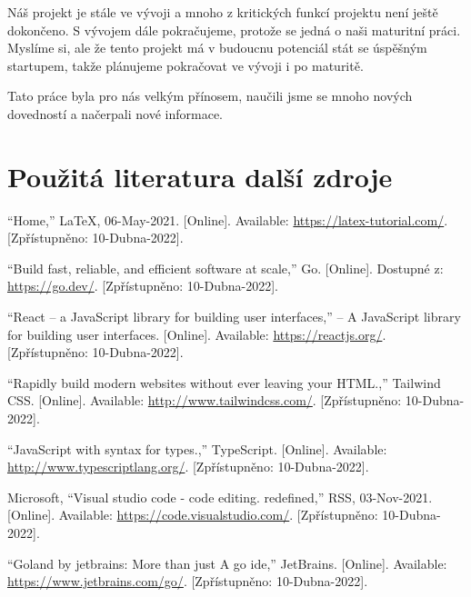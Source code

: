 \documentclass[12pt,a4paper]{article}
\begin{document}
Náš projekt je stále ve vývoji a mnoho z kritických funkcí projektu není ještě
dokončeno. S vývojem dále pokračujeme, protože se jedná o naši maturitní práci.
Myslíme si, ale že tento projekt má v budoucnu potenciál stát se úspěšným
startupem, takže plánujeme pokračovat ve vývoji i po maturitě.

Tato práce byla pro nás velkým přínosem, naučili jsme se mnoho nových
dovedností a načerpali nové informace.


\clearpage

\section{Použitá literatura další zdroje }

\begin{thebibliography}{9}
	\vspace*{-1.5cm}
	“Home,” LaTeX, 06-May-2021. [Online]. Available: \href{https://latex-tutorial.com/}{https://latex-tutorial.com/}. [Zpřístupněno: 10-Dubna-2022]. 

	“Build fast, reliable, and efficient software at scale,” Go. [Online]. Dostupné z: \href{https://go.dev/}{https://go.dev/}. [Zpřístupněno: 10-Dubna-2022]. 

	“React – a JavaScript library for building user interfaces,” – A JavaScript library for building user interfaces. [Online]. Available: \href{https://reactjs.org/}{https://reactjs.org/}. [Zpřístupněno: 10-Dubna-2022]. 

	“Rapidly build modern websites without ever leaving your HTML.,” Tailwind CSS. [Online]. Available: \href{http://www.tailwindcss.com/}{http://www.tailwindcss.com/}. [Zpřístupněno: 10-Dubna-2022]. 

	“JavaScript with syntax for types.,” TypeScript. [Online]. Available: \href{http://www.typescriptlang.org/}{http://www.typescriptlang.org/}. [Zpřístupněno: 10-Dubna-2022]. 

	Microsoft, “Visual studio code - code editing. redefined,” RSS, 03-Nov-2021. [Online]. Available: \href{https://code.visualstudio.com/}{https://code.visualstudio.com/}. [Zpřístupněno: 10-Dubna-2022]. 

	“Goland by jetbrains: More than just A go ide,” JetBrains. [Online]. Available: \href{https://www.jetbrains.com/go/}{https://www.jetbrains.com/go/}. [Zpřístupněno: 10-Dubna-2022]. 


\end{thebibliography}
\end{document}
